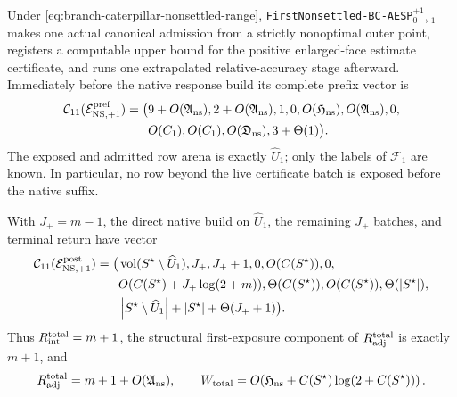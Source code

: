 \begin{theorem}
\label{thm:branch-caterpillar-first-nonsettled-continuation}
Under \cref{eq:branch-caterpillar-nonsettled-range},
\texttt{FirstNonsettled-BC-AESP}$_{0\to1}^{+1}$ makes one actual canonical
admission from a strictly nonoptimal outer point, registers a computable
upper bound for the positive enlarged-face estimate certificate, and runs
one extrapolated relative-accuracy stage afterward.  Immediately before the
native response build its complete prefix vector is
\begin{equation}
 \begin{aligned}
 \mathcal C_{11}(\mathcal E_{\rm NS,+1}^{\rm pref})=\bigl(&
 9+O(\mathfrak A_{\rm ns}),
 2+O(\mathfrak A_{\rm ns}),1,0,O(\mathfrak H_{\rm ns}),
 O(\mathfrak A_{\rm ns}),0,\\
 &O(C_1),O(C_1),O(\mathfrak D_{\rm ns}),3+\Theta(1)\bigr).
 \end{aligned}
 \label{eq:branch-caterpillar-nonsettled-prefix-eleven-vector}
\end{equation}
The exposed and admitted row arena is exactly $\widehat U_1$; only the labels
of $\mathcal F_1$ are known.  In particular, no row beyond the live
certificate batch is exposed before the native suffix.

With $J_+=m-1$, the direct native build on $\widehat U_1$, the remaining
$J_+$ batches, and terminal return have vector
\begin{equation}
 \begin{aligned}
 \mathcal C_{11}(\mathcal E_{\rm NS,+1}^{\rm post})=\bigl(&
 \operatorname{vol}(S^\star\setminus\widehat U_1),J_+,J_++1,0,
 O(C(S^\star)),0,\\
 &O(C(S^\star)+J_+\log(2+m)),
 \Theta(C(S^\star)),O(C(S^\star)),\Theta(\left\lvert S^\star \right\rvert),\\
 &\left\lvert S^\star\setminus\widehat U_1 \right\rvert
  +\left\lvert S^\star \right\rvert+\Theta(J_++1)\bigr).
 \end{aligned}
 \label{eq:branch-caterpillar-nonsettled-post-eleven-vector}
\end{equation}
Thus $R_{\rm int}^{\rm total}=m+1$, the structural first-exposure component
of $R_{\rm adj}^{\rm total}$ is exactly $m+1$, and
\begin{equation}
 R_{\rm adj}^{\rm total}=m+1+O(\mathfrak A_{\rm ns}),
 \qquad
 W_{\rm total}=O\!\left(
 \mathfrak H_{\rm ns}+C(S^\star)\log(2+C(S^\star))\right).
 \label{eq:branch-caterpillar-nonsettled-total-work}
\end{equation}


\end{theorem}
